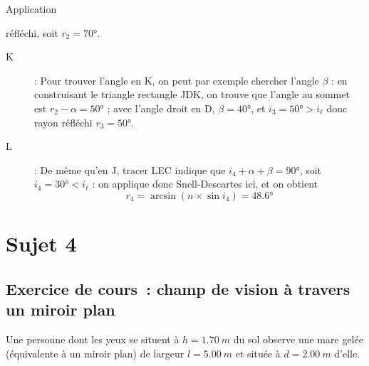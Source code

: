 \documentclass[a4paper, 11pt, oneside]{book}
\begin{document}
{\begin{NCexem}[sidebyside]{Application}
\begin{description}
            réfléchi, soit $\boxed{r_2 = \ang{70;;}}$.
    \end{description}
    \tcblower
    \begin{description}
        \item[K] : Pour trouver l'angle en K, on peut par exemple chercher
            l'angle $\beta$ : en construisant le triangle rectangle JDK, on
            trouve que l'angle au sommet est $r_2 - \alpha = \ang{50;;}$ ;
            avec l'angle droit en D, $\beta = \ang{40;;}$, et $\boxed{i_3
            = \ang{50;;} > i_\ell}$ donc rayon réfléchi $\boxed{r_3 =
        \ang{50;;}}$.
        \item[L] : De même qu'en J, tracer LEC indique que $i_4 + \alpha + \beta
            = \ang{90;;}$, soit $\boxed{i_4 = \ang{30;;} < i_\ell}$
            : on applique donc Snell-Descartes ici, et on obtient
            \[\boxed{r_4} = \arcsin (n\times \sin i_4) =
            \boxed{\ang{48.6;;}}\]
    \end{description}
\end{NCexem}

}

\resetQ

\chapter{Sujet 4}
\section{Exercice de cours~: champ de vision à travers un miroir plan}

Une personne dont les yeux se situent à $h = \SI{1.70}{m}$ du sol observe une
mare gelée (équivalente à un miroir plan) de largeur $l = \SI{5.00}{m}$ et
située à $d = \SI{2.00}{m}$ d'elle.
\end{document}
